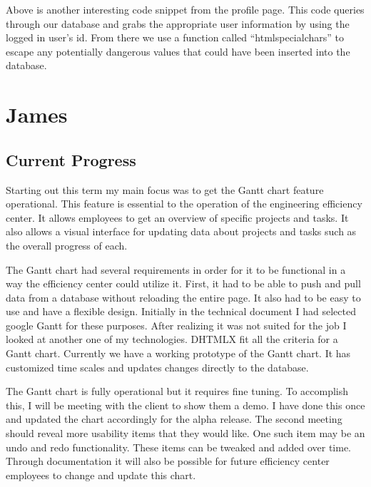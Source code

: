 \documentclass[letterpaper,10pt,titlepage,journal,compsoc,draftclsnofoot,onecolumn]{IEEEtran}
\newcommand\tab[1][1cm]{\hspace*{#1}}
\begin{document}
\tab
Above is another interesting code snippet from the profile page. This code queries through our database and grabs the appropriate user information by using the logged in user’s id. From there we use a function called “htmlspecialchars” to escape any potentially dangerous values that could have been inserted into the database.
\newline

\section{James}

\subsection{Current Progress}

\tab
Starting out this term my main focus was to get the Gantt chart feature operational. This feature is essential to the operation of the engineering efficiency center. It allows employees to get an overview of specific projects and tasks. It also allows a visual interface for updating data about projects and tasks such as the overall progress of each.
\newline

\tab
The Gantt chart had several requirements in order for it to be functional in a way the efficiency center could utilize it. First, it had to be able to push and pull data from a database without reloading the entire page. It also had to be easy to use and have a flexible design. Initially in the technical document I had selected google Gantt for these purposes. After realizing it was not suited for the job I looked at another one of my technologies. DHTMLX fit all the criteria for a Gantt chart. Currently we have a working prototype of the Gantt chart. It has customized time scales and updates changes directly to the database.
\newline

\tab
The Gantt chart is fully operational but it requires fine tuning. To accomplish this, I will be meeting with the client to show them a demo. I have done this once and updated the chart accordingly for the alpha release. The second meeting should reveal more usability items that they would like. One such item may be an undo and redo functionality. These items can be tweaked and added over time. Through documentation it will also be possible for future efficiency center employees to change and update this chart.
\newline
\end{document}
